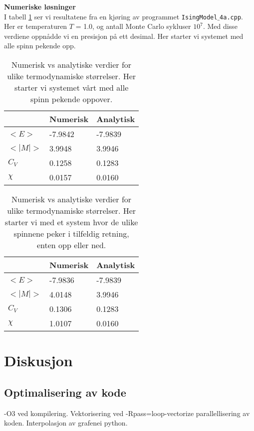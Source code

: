 \documentclass[11pt,a4paper]{article}
\begin{document}
\textbf{Numeriske løsninger}\\

 I tabell \ref{num_vs_an} ser vi resultatene fra en kjøring av programmet \texttt{IsingModel$\_$4a.cpp}. Her er temperaturen $T$ = 1.0, og antall Monte Carlo sykluser $10^7$. Med disse verdiene oppnådde vi en presisjon på ett desimal. Her starter vi systemet med alle spinn pekende opp.

\FloatBarrier
\begin{table}[!ht]
\centering
\caption{Numerisk vs analytiske verdier for ulike termodynamiske størrelser. Her starter vi systemet vårt med alle spinn pekende oppover.}
\label{num_vs_an}
\begin{tabular}{|l|l|l|}
\hline
        & Numerisk & Analytisk \\ \hline
$<E>$   & -7.9842  & -7.9839   \\ \hline
$<|M|>$ & 3.9948   & 3.9946    \\ \hline
$C_V$   & 0.1258   & 0.1283    \\ \hline
$\chi$  & 0.0157   & 0.0160    \\ \hline
\end{tabular}
\end{table}
\FloatBarrier

\FloatBarrier
\begin{table}[!ht]
\centering
\caption{Numerisk vs analytiske verdier for ulike termodynamiske størrelser. Her starter vi med et system hvor de ulike spinnene peker i tilfeldig retning, enten opp eller ned.}
\label{num_vs_an2}
\begin{tabular}{|l|l|l|}
\hline
        & Numerisk & Analytisk \\ \hline
$<E>$   & -7.9836  & -7.9839   \\ \hline
$<|M|>$ & 4.0148   & 3.9946    \\ \hline
$C_V$   & 0.1306   & 0.1283    \\ \hline
$\chi$  & 1.0107   & 0.0160    \\ \hline
\end{tabular}
\end{table}
\FloatBarrier



\section{Diskusjon}
\subsection{Optimalisering av kode}
-O3 ved kompilering. 
Vektorisering ved -Rpass=loop-vectorize
parallellisering av koden.
Interpolasjon av grafenei python.
\end{document}
